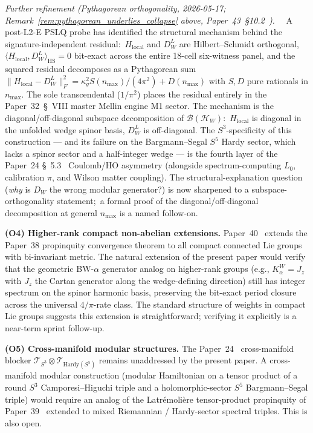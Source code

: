 \documentclass[11pt,a4paper]{article}
\theoremstyle{plain}
\theoremstyle{definition}
\newcommand{\sthree}{S^{3}}
\newcommand{\Hilb}{\mathcal{H}}
\newcommand{\Tcal}{\mathcal{T}}
\begin{document}
\emph{Further refinement (Pythagorean orthogonality,
2026-05-17; Remark~\ref{rem:pythagorean_underlies_collapse} above,
Paper~43~\S 10.2~\cite{paper43}).}\ \ %
A post-L2-E PSLQ probe has identified the structural mechanism
behind the signature-independent residual:\ $H_{\mathrm{local}}$
and $D_W^L$ are Hilbert--Schmidt orthogonal,
$\langle H_{\mathrm{local}}, D_W^L \rangle_{\mathrm{HS}} = 0$
bit-exact across the entire 18-cell six-witness panel, and the
squared residual decomposes as a Pythagorean sum
$\|H_{\mathrm{local}} - D_W^L\|_F^2 = \kappa_g^2 S(n_{\max}) /
(4\pi^2) + D(n_{\max})$ with $S, D$ pure rationals in $n_{\max}$.
The sole transcendental ($1/\pi^2$) places the residual entirely
in the Paper~32~\S~VIII master Mellin engine M1 sector. The
mechanism is the diagonal/off-diagonal subspace decomposition of
$\mathcal{B}(\Hilb_W)$:\ $H_{\mathrm{local}}$ is diagonal in the
unfolded wedge spinor basis, $D_W^L$ is off-diagonal. The
$S^3$-specificity of this construction --- and its failure on the
Bargmann--Segal $S^5$ Hardy sector, which lacks a spinor sector
and a half-integer wedge --- is the fourth layer of the Paper~24
\S~5.3~\cite{paper24} Coulomb/HO asymmetry (alongside
spectrum-computing $L_0$, calibration $\pi$, and Wilson matter
coupling). The structural-explanation question (\emph{why} is
$D_W$ the wrong modular generator?) is now sharpened to a
subspace-orthogonality statement;\ a formal proof of the
diagonal/off-diagonal decomposition at general $n_{\max}$ is a
named follow-on.

\textbf{(O4) Higher-rank compact non-abelian extensions.}
Paper~40~\cite{paper40_unified} extends the Paper~38 propinquity
convergence theorem to all compact connected Lie groups with
bi-invariant metric. The natural extension of the present paper would
verify that the geometric BW-$\alpha$ generator analog on higher-rank
groups (e.g., $K_\alpha^W = J_z$ with $J_z$ the Cartan generator
along the wedge-defining direction) still has integer spectrum on the
spinor harmonic basis, preserving the bit-exact period closure across
the universal $4/\pi$-rate class. The standard structure of weights
in compact Lie groups suggests this extension is straightforward;
verifying it explicitly is a near-term sprint follow-up.

\textbf{(O5) Cross-manifold modular structures.}
The Paper~24~\cite{paper24} cross-manifold blocker
$\Tcal_{\sthree} \otimes \Tcal_{\mathrm{Hardy}(S^5)}$ remains
unaddressed by the present paper. A cross-manifold modular construction
(modular Hamiltonian on a tensor product of a round $\sthree$
Camporesi--Higuchi triple and a holomorphic-sector $S^5$
Bargmann--Segal triple) would require an analog of the Latr\'emoli\`ere
tensor-product propinquity of Paper~39~\cite{paper39} extended to
mixed Riemannian / Hardy-sector spectral triples. This is also open.
\end{document}
